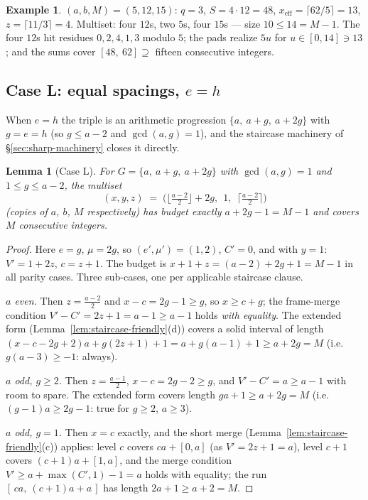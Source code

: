 \documentclass[11pt,reqno]{amsart}
\theoremstyle{plain}
\newtheorem{lemma}[theorem]{Lemma}
\theoremstyle{definition}
\newtheorem{example}[theorem]{Example}
\theoremstyle{remark}
\begin{document}
\begin{example}
$(a, b, M) = (5, 12, 15)$: $q = 3$, $S = 4 \cdot 12 = 48$, $x_{\mathrm{eff}} =
\lceil 62/5 \rceil = 13$, $z = \lceil 11/3 \rceil = 4$. Multiset: four $12$s, two
$5$s, four $15$s --- size $10 \le 14 = M - 1$. The four $12$s hit residues $0, 2,
4, 1, 3$ modulo $5$; the pads realize $5u$ for $u \in [0, 14] \ni 13$; and the
sums cover $[48,\ 62] \supseteq$ fifteen consecutive integers.
\end{example}

\subsection{Case L: equal spacings, \texorpdfstring{$e = h$}{e = h}}

When $e = h$ the triple is an arithmetic progression $\{a,\ a + g,\ a + 2g\}$ with
$g = e = h$ (so $g \le a - 2$ and $\gcd(a, g) = 1$), and the staircase machinery
of \S\ref{sec:sharp-machinery} closes it directly.

\begin{lemma}[Case L]\label{lem:caseL-friendly}
For $G = \{a,\ a+g,\ a+2g\}$ with $\gcd(a,g) = 1$ and $1 \le g \le a-2$, the
multiset
\[
  (x, y, z) \;=\; \Big( \Big\lfloor \tfrac{a-2}{2} \Big\rfloor + 2g,\ \ 1,\ \
  \Big\lceil \tfrac{a-2}{2} \Big\rceil \Big)
\]
(copies of $a$, $b$, $M$ respectively) has budget exactly $a + 2g - 1 = M - 1$ and
covers $M$ consecutive integers.
\end{lemma}

\begin{proof}
Here $e = g$, $\mu = 2g$, so $(e', \mu') = (1, 2)$, $C' = 0$, and with $y = 1$:
$V' = 1 + 2z$, $c = z + 1$. The budget is $x + 1 + z = (a - 2) + 2g + 1 = M - 1$
in all parity cases. Three sub-cases, one per applicable staircase clause.

\emph{$a$ even.} Then $z = \frac{a-2}{2}$ and $x - c = 2g - 1 \ge g$, so $x \ge c
+ g$; the frame-merge condition $V' - C' = 2z + 1 = a - 1 \ge a - 1$ holds
\emph{with equality}. The extended form (Lemma~\ref{lem:staircase-friendly}(d))
covers a solid interval of length $(x - c - 2g + 2)a + g(2z+1) + 1 = a + g(a-1) +
1 \ge a + 2g = M$ (i.e.\ $g(a-3) \ge -1$: always).

\emph{$a$ odd, $g \ge 2$.} Then $z = \frac{a-1}{2}$, $x - c = 2g - 2 \ge g$, and
$V' - C' = a \ge a - 1$ with room to spare. The extended form covers length
$ga + 1 \ge a + 2g = M$ (i.e.\ $(g-1)a \ge 2g - 1$: true for $g \ge 2$, $a \ge
3$).

\emph{$a$ odd, $g = 1$.} Then $x = c$ exactly, and the short merge
(Lemma~\ref{lem:staircase-friendly}(c)) applies: level $c$ covers $ca + [0, a]$
(as $V' = 2z + 1 = a$), level $c+1$ covers $(c+1)a + [1, a]$, and the merge
condition $V' \ge a + \max(C',1) - 1 = a$ holds with equality; the run
$[\,ca,\ (c+1)a + a\,]$ has length $2a + 1 \ge a + 2 = M$.
\end{proof}
\end{document}
